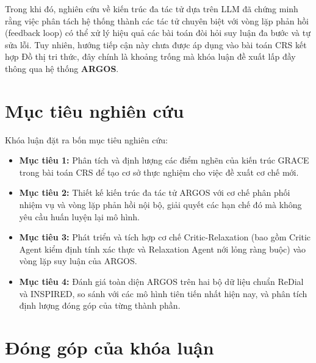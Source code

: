 Trong khi đó, nghiên cứu về kiến trúc đa tác tử dựa trên LLM \cite{xi2023rise} đã chứng minh rằng việc phân tách hệ thống thành các tác tử chuyên biệt với vòng lặp phản hồi (feedback loop) có thể xử lý hiệu quả các bài toán đòi hỏi suy luận đa bước và tự sửa lỗi. Tuy nhiên, hướng tiếp cận này chưa được áp dụng vào bài toán CRS kết hợp Đồ thị tri thức, đây chính là khoảng trống mà khóa luận đề xuất lấp đầy thông qua hệ thống \textbf{ARGOS}.

\section{Mục tiêu nghiên cứu}

Khóa luận đặt ra bốn mục tiêu nghiên cứu:
\begin{itemize}
    \item \textbf{Mục tiêu 1:} Phân tích và định lượng các điểm nghẽn của kiến trúc GRACE trong bài toán CRS để tạo cơ sở thực nghiệm cho việc đề xuất cơ chế mới.
    \item \textbf{Mục tiêu 2:} Thiết kế kiến trúc đa tác tử ARGOS với cơ chế phân phối nhiệm vụ và vòng lặp phản hồi nội bộ, giải quyết các hạn chế đó mà không yêu cầu huấn luyện lại mô hình.
    \item \textbf{Mục tiêu 3:} Phát triển và tích hợp cơ chế Critic-Relaxation (bao gồm Critic Agent kiểm định tính xác thực và Relaxation Agent nới lỏng ràng buộc) vào vòng lặp suy luận của ARGOS.
    \item \textbf{Mục tiêu 4:} Đánh giá toàn diện ARGOS trên hai bộ dữ liệu chuẩn ReDial và INSPIRED, so sánh với các mô hình tiên tiến nhất hiện nay, và phân tích định lượng đóng góp của từng thành phần.
\end{itemize}

\section{Đóng góp của khóa luận}

